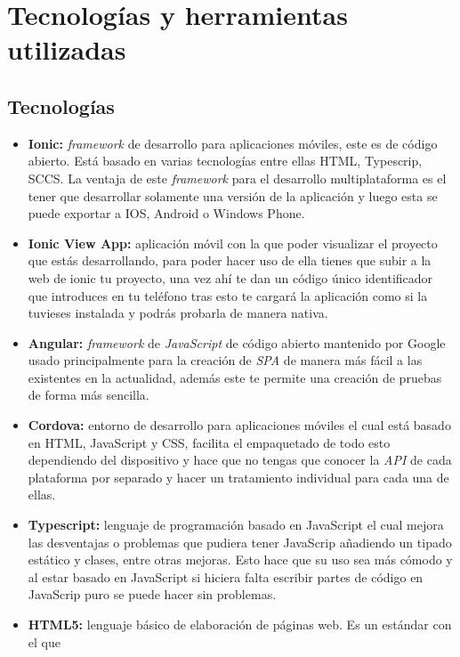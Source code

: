 \section{Tecnologías y herramientas utilizadas}
\subsection{Tecnologías}
\begin{itemize}
    \item\textbf{Ionic:} \textit{framework} de desarrollo para aplicaciones móviles, este es
    de código abierto. Está basado en varias tecnologías entre ellas HTML, Typescrip, SCCS. La
    ventaja de este \textit{framework} para el desarrollo multiplataforma es el tener que
    desarrollar solamente una versión de la aplicación y luego esta se puede exportar a IOS,
    Android o Windows Phone.
    \item\textbf{Ionic View App:} aplicación móvil con la que poder visualizar el proyecto que
    estás desarrollando, para poder hacer uso de ella tienes que subir a la web de ionic tu
    proyecto, una vez ahí te dan un código único identificador que introduces en tu teléfono
    tras esto te cargará la aplicación como si la tuvieses instalada y podrás probarla de manera
    nativa.
    \item\textbf{Angular:} \textit{framework} de \textit{JavaScript} de código abierto mantenido
    por Google usado principalmente para la creación de \textit{SPA}\cite{SPA} de manera más fácil
    a las existentes en la actualidad, además este te permite una creación de pruebas de forma más
    sencilla.
    \item\textbf{Cordova:} entorno de desarrollo para aplicaciones móviles el cual está basado en
    HTML, JavaScript y CSS, facilita el empaquetado de todo esto dependiendo del dispositivo y
    hace que no tengas que conocer la \textit{API}\cite{api} de cada plataforma por separado y
    hacer un tratamiento individual para cada una de ellas.
    \item\textbf{Typescript:} lenguaje de programación basado en JavaScript el cual mejora las
    desventajas o problemas que pudiera tener JavaScrip añadiendo un tipado estático y clases,
    entre otras mejoras. Esto hace que su uso sea más cómodo y al estar basado en JavaScript si
    hiciera falta escribir partes de código en JavaScrip puro se puede hacer sin problemas.
    \item\textbf{HTML5:} lenguaje básico de elaboración de páginas web. Es un estándar con el que

\end{itemize}
